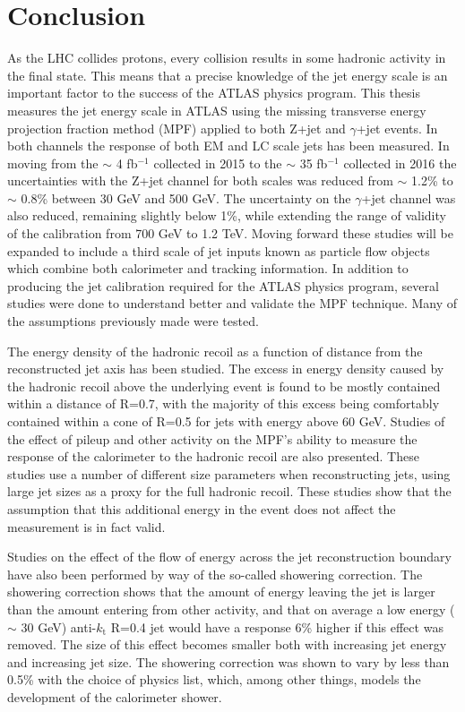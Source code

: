 \chapter{Conclusion}

As the LHC collides protons, every collision results in some hadronic activity in the final state.  
This means that a precise knowledge of the jet energy scale is an important factor to the success of the ATLAS physics program.  
This thesis measures the jet energy scale in ATLAS using the missing transverse energy projection fraction method (MPF) applied to both Z+jet and $\gamma$+jet events.  
In both channels the response of both EM and LC scale jets has been measured.  
In moving from the $\sim$ 4 fb$^{-1}$ collected in 2015 to the $\sim$ 35 fb$^{-1}$ collected in 2016 the uncertainties with the Z+jet channel for both scales was reduced from $\sim$ 1.2\% to $\sim$ 0.8\% between 30 GeV and 500 GeV.   
The uncertainty on the $\gamma$+jet channel was also reduced, remaining slightly below 1\%,  while extending the range of validity of the calibration from 700 GeV to 1.2 TeV.  
Moving forward these studies will be expanded to include a third scale of jet inputs known as particle flow objects which combine both calorimeter and tracking information.  
In addition to producing the jet calibration required for the ATLAS physics program, several studies were done to understand better and validate the MPF technique.  
Many of the assumptions previously made were tested.

The energy density of the hadronic recoil as a function of distance from the reconstructed jet axis has been studied.  
The excess in energy density caused by the hadronic recoil above the underlying event is found to be mostly contained within a distance of R=0.7, with the majority of this excess being comfortably contained within a cone of R=0.5 for jets with energy above 60 GeV.  
Studies of the effect of pileup and other activity on the MPF's ability to measure the response of the calorimeter to the hadronic recoil are also presented.  
These studies use a number of different size parameters when reconstructing jets, using large jet sizes as a proxy for the full hadronic recoil.  
These studies show that the assumption that this additional energy in the event does not affect the measurement is in fact valid.  


Studies on the effect of the flow of energy across the jet reconstruction boundary have also been performed by way of the so-called showering correction.  
The showering correction shows that the amount of energy leaving the jet is larger than the amount entering from other activity, and that on average a low energy ($\sim$ 30 GeV) anti-$k_\mathrm{t}$ R=0.4 jet would have a response 6\% higher if this effect was removed.  
The size of this effect becomes smaller both with increasing jet energy and increasing jet size.  
The showering correction was shown to vary by less than 0.5\% with the choice of physics list, which, among other things, models the development of the calorimeter shower.

